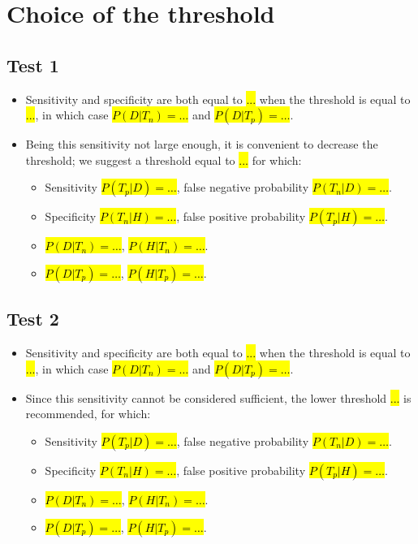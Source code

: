 \documentclass[12pt]{article}
\begin{document}
\clearpage

\section{Choice of the threshold}

\subsection{Test 1}
\begin{itemize}
    \item Sensitivity and specificity are both equal to \hl{...} when the threshold is equal to \hl{...}, in which case \hl{$P(D|T_n)= \ldots$} and  \hl{$P(D|T_p)= \ldots$}.
    \item Being this sensitivity not large enough, it is convenient to decrease the threshold; we suggest a threshold equal to \hl{...} for which:
    \begin{itemize}
        \item Sensitivity \hl{$P(T_p|D)=\ldots$}, false negative probability \hl{$P(T_n|D)=\ldots$}.
        \item Specificity \hl{$P(T_n|H)=\ldots$}, false positive probability \hl{$P(T_p|H)=\ldots$}.
        \item \hl{$P(D|T_n)=\ldots$}, \hl{$P(H|T_n)=\ldots$}.
        \item \hl{$P(D|T_p)=\ldots$}, \hl{$P(H|T_p)=\ldots$}.
    \end{itemize}
\end{itemize}

\subsection{Test 2}
\begin{itemize}
    \item Sensitivity and specificity are both equal to \hl{...} when the threshold is equal to \hl{...}, in which case \hl{$P(D|T_n)= \ldots$} and  \hl{$P(D|T_p)= \ldots$}.
    \item Since this sensitivity cannot be considered sufficient, the lower threshold  \hl{...} is recommended, for which:
    \begin{itemize}
        \item Sensitivity \hl{$P(T_p|D)=\ldots$}, false negative probability \hl{$P(T_n|D)=\ldots$}.
        \item Specificity \hl{$P(T_n|H)=\ldots$}, false positive probability \hl{$P(T_p|H)=\ldots$}.
        \item \hl{$P(D|T_n)=\ldots$}, \hl{$P(H|T_n)=\ldots$}.
        \item \hl{$P(D|T_p)=\ldots$}, \hl{$P(H|T_p)=\ldots$}.
    \end{itemize}
\end{itemize}
\end{document}
